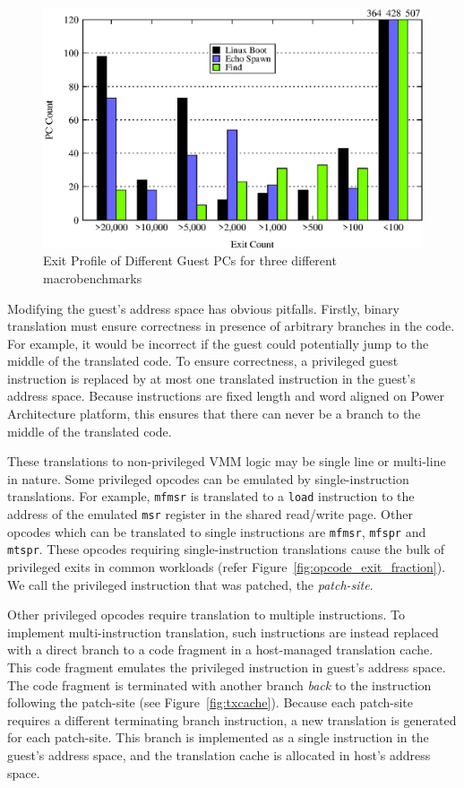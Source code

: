 \begin{figure}[!tb]
\centering
\includegraphics[scale=0.5]{pc_count.eps}
\caption{\label{fig:pc_profile}Exit Profile of Different Guest PCs for three different macrobenchmarks}
\end{figure}

Modifying the guest's address space has obvious pitfalls. Firstly, binary translation must ensure correctness in presence of arbitrary branches in the code. For example, it would be incorrect if the guest could potentially jump to the middle of the translated code. To ensure correctness, a privileged guest instruction is replaced by at most one translated instruction in the guest's address space. Because instructions are fixed length and word aligned on Power Architecture platform, this ensures that there can never be a branch to the middle of the translated code.

These translations to non-privileged VMM logic may be single line  or multi-line in nature. Some privileged opcodes can be emulated by single-instruction translations. For example, {\tt mfmsr} is translated to a {\tt load} instruction to the address of the emulated {\tt msr} register in the shared read/write page. Other opcodes which can be translated to single instructions are {\tt mfmsr}, {\tt mfspr} and {\tt mtspr}. These opcodes requiring single-instruction translations cause the bulk of privileged exits in common workloads (refer Figure~\ref {fig:opcode_exit_fraction}). We call the privileged instruction that was patched, the {\em patch-site}.

Other privileged opcodes require translation to multiple instructions. To implement multi-instruction translation, such instructions are instead replaced with a direct branch to a code fragment in a host-managed translation cache. This code fragment emulates the privileged instruction in guest's address space. The code fragment is terminated with another branch {\em back} to the instruction following the patch-site (see Figure~\ref{fig:txcache}). Because each patch-site requires a different terminating branch instruction, a new translation is generated for each patch-site. This branch is implemented as a single instruction in the guest's address space, and the translation cache is allocated in host's address space.

